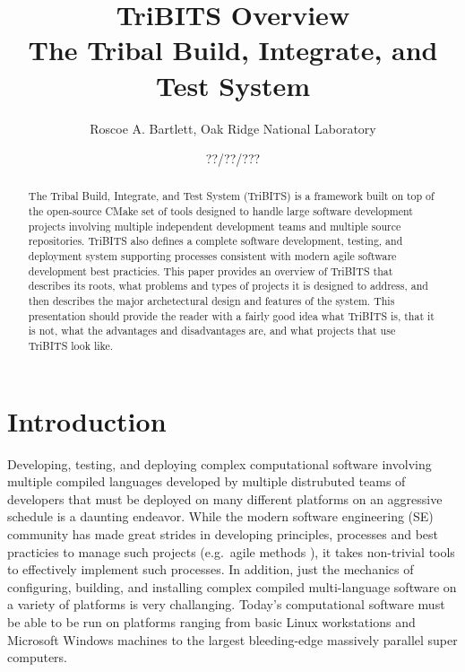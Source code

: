 \documentclass[10pt]{article}
\title{
TriBITS Overview \\[1.5ex]
\large The Tribal Build, Integrate, and Test System
}
\author{Roscoe A. Bartlett, Oak Ridge National Laboratory}
\date{??/??/???}
\begin{document}
\maketitle

\begin{abstract}

The Tribal Build, Integrate, and Test System (TriBITS) is a framework built on top of the open-source CMake set of tools designed to handle large software development projects involving multiple independent development teams and multiple source repositories.  TriBITS also defines a complete software development, testing, and deployment system supporting processes consistent with modern agile software development best practicies.  This paper provides an overview of TriBITS that describes its roots, what problems and types of projects it is designed to address, and then describes the major archetectural design and features of the system.  This presentation should provide the reader with a fairly good idea what TriBITS is, that it is not, what the advantages and disadvantages are, and what projects that use TriBITS look like.

\end{abstract}

\tableofcontents

%
\section{Introduction}
%

Developing, testing, and deploying complex computational software involving multiple compiled languages developed by multiple distrubuted teams of developers that must be deployed on many different platforms on an aggressive schedule is a daunting endeavor.  While the modern software engineering (SE) community has made great strides in developing principles, processes and best practicies to manage such projects (e.g.\ agile methods \cite{CodeComplete2nd04, AgileSoftwareDevelopment, ContinuousIntegration07, XP2, TDD}), it takes non-trivial tools to effectively implement such processes.  In addition, just the mechanics of configuring, building, and installing complex compiled multi-language software on a variety of platforms is very challanging.  Today's computational software must be able to be run on platforms ranging from basic Linux workstations and Microsoft Windows machines to the largest bleeding-edge massively parallel super computers.
\end{document}
